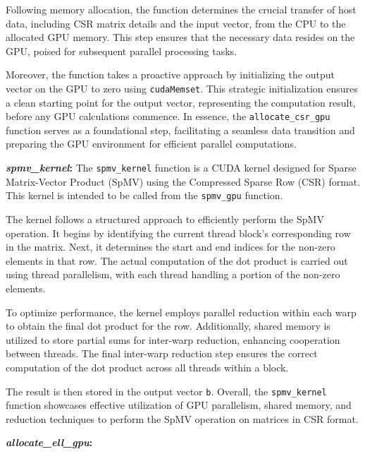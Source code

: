 \documentclass[11pt, twocolumn]{article}
\begin{document}
Following memory allocation, the function determines the crucial transfer of host data, including CSR matrix details and the input vector, from the CPU to the allocated GPU memory. This step ensures that the necessary data resides on the GPU, poised for subsequent parallel processing tasks.

Moreover, the function takes a proactive approach by initializing the output vector on the GPU to zero using \texttt{cudaMemset}. This strategic initialization ensures a clean starting point for the output vector, representing the computation result, before any GPU calculations commence. In essence, the \texttt{allocate\_csr\_gpu} function serves as a foundational step, facilitating a seamless data transition and preparing the GPU environment for efficient parallel computations.

\textbf{\textit{spmv\_kernel}:} 
The \texttt{spmv\_kernel} function is a CUDA kernel designed for Sparse Matrix-Vector Product (SpMV) using the Compressed Sparse Row (CSR) format. This kernel is intended to be called from the \texttt{spmv\_gpu} function.

The kernel follows a structured approach to efficiently perform the SpMV operation. It begins by identifying the current thread block's corresponding row in the matrix. Next, it determines the start and end indices for the non-zero elements in that row. The actual computation of the dot product is carried out using thread parallelism, with each thread handling a portion of the non-zero elements.

To optimize performance, the kernel employs parallel reduction within each warp to obtain the final dot product for the row. Additionally, shared memory is utilized to store partial sums for inter-warp reduction, enhancing cooperation between threads. The final inter-warp reduction step ensures the correct computation of the dot product across all threads within a block.

The result is then stored in the output vector \texttt{b}. Overall, the \texttt{spmv\_kernel} function showcases effective utilization of GPU parallelism, shared memory, and reduction techniques to perform the SpMV operation on matrices in CSR format.

\textbf{\textit{allocate\_ell\_gpu}:}
\end{document}
